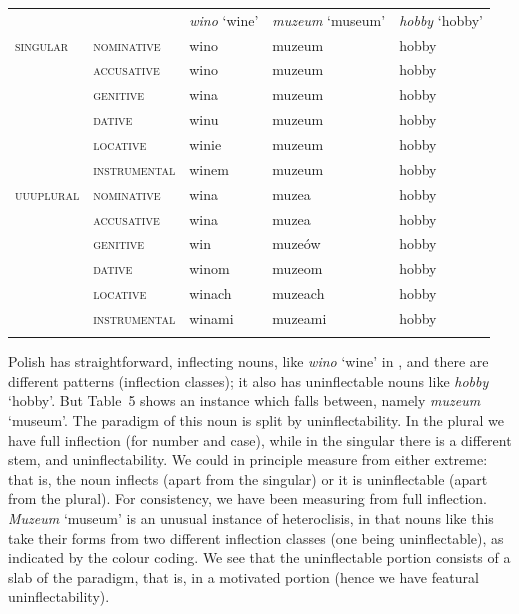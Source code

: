 \documentclass[output=paper]{langscibook}
\begin{document}
\begin{tabularx}{\textwidth}{XXXXX}

\lsptoprule
\multicolumn{1}{c}{} &  & \textit{wino} ‘wine’ & \textit{muzeum} ‘museum’ & \textit{hobby} ‘hobby’\\
 \textsc{singular} & \textsc{nominative} & wino & muzeum & hobby\\
& \textsc{accusative} & wino & muzeum & hobby\\
& \textsc{genitive} & wina & muzeum & hobby\\
& \textsc{dative} & winu & muzeum & hobby\\
& \textsc{locative} & winie & muzeum & hobby\\
& \textsc{instrumental} & winem & muzeum & hobby\\
 \textsc{uuuplural} & \textsc{nominative} & wina & muzea & hobby\\
& \textsc{accusative} & wina & muzea & hobby\\
& \textsc{genitive} & win & muzeów\footnotemark{} & hobby\\
& \textsc{dative} & winom & muzeom & hobby\\
& \textsc{locative} & winach & muzeach & hobby\\
& \textsc{instrumental} & winami & muzeami & hobby\\
\lspbottomrule
\end{tabularx}
\begin{table}
\caption{Three Polish nouns (\citealt{Swan2002}: 116, 118, 121)}
\label{tab:key:5}
\end{table}

Polish has straightforward, inflecting nouns, like \textit{wino} ‘wine’ in , and there are different patterns (inflection classes); it also has uninflectable nouns like \textit{hobby} ‘hobby’. But Table~5 shows an instance which falls between, namely \textit{muzeum} ‘museum’. The paradigm of this noun is split by uninflectability. In the plural we have full inflection (for number and case), while in the singular there is a different stem, and uninflectability. We could in principle measure from either extreme: that is, the noun inflects (apart from the singular) or it is uninflectable (apart from the plural). For consistency, we have been measuring from full inflection. \textit{Muzeum} ‘museum’ is an unusual instance of heteroclisis, in that nouns like this take their forms from two different inflection classes (one being uninflectable), as indicated by the colour coding. We see that the uninflectable portion consists of a slab of the paradigm, that is, in a motivated portion (hence we have featural uninflectability). 
\end{document}
